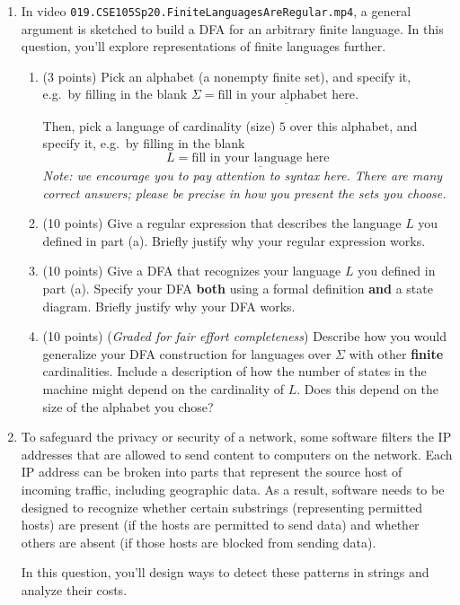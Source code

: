 \begin{enumerate}

\item  In video \texttt{019.CSE105Sp20.FiniteLanguagesAreRegular.mp4}, a general 
argument is sketched to build a DFA for an arbitrary finite language. In this question, 
you'll explore representations of finite languages further.
\begin{enumerate}
\item (3 points) Pick an alphabet (a nonempty finite set), and specify it, e.g.\ by filling in the blank 
$\Sigma =  \underline{\text{fill in your alphabet here}}$.

Then, pick a language of cardinality (size) $5$ over this alphabet, and specify it, e.g.\ by filling in the blank
\[
L =  \underline{\text{fill in your language here}}
\]
{\it Note: we encourage you to pay attention to syntax here.  There are many correct answers; please be 
precise in how you present the sets you choose.}

\item (10 points) Give a regular expression that describes the language $L$ you defined in part (a).  Briefly justify why your regular expression
works.
\item (10 points) Give a DFA that recognizes your language $L$ you defined in part (a).  Specify your DFA {\bf both} using a formal definition
{\bf and} a state diagram. Briefly justify why your DFA works.
\item (10 points) ({\it Graded for fair effort completeness}) Describe how you would generalize your DFA construction
for languages over $\Sigma$ with other {\bf finite} cardinalities. 
Include a description of how the number of states
in the machine might depend on the cardinality of $L$. Does this depend on the size of the alphabet you 
chose?
\end{enumerate}

\item To safeguard the privacy or security of a network, some software filters
the IP addresses that are allowed to send content to computers on the network. Each IP address
can be broken into parts that represent the source host of incoming traffic, including geographic data.
As a result, software needs to be designed to recognize whether certain substrings (representing
permitted hosts) are present (if the hosts are permitted to send data) and whether others
are absent (if those hosts are blocked from sending data).

In this question, you'll design ways to detect these patterns in strings and analyze their costs.


\end{enumerate}
